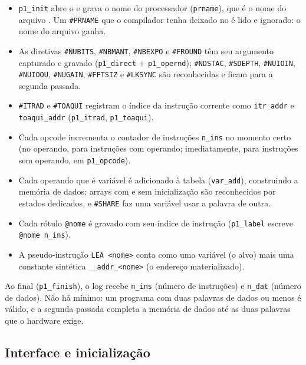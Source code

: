 \begin{itemize}[leftmargin=1.2em]
  \item \lstinline|p1_init| abre o  e grava o nome do
    processador (\lstinline|prname|), que é o nome do arquivo . Um
    \lstinline|#PRNAME| que o compilador tenha deixado no  é lido e
    ignorado: o nome do arquivo ganha.
  \item As diretivas \lstinline|#NUBITS|, \lstinline|#NBMANT|, \lstinline|#NBEXPO|
    e \lstinline|#FROUND| têm seu argumento capturado e gravado
    (\lstinline|p1_direct| + \lstinline|p1_opernd|); \lstinline|#NDSTAC|,
    \lstinline|#SDEPTH|, \lstinline|#NUIOIN|, \lstinline|#NUIOOU|,
    \lstinline|#NUGAIN|, \lstinline|#FFTSIZ| e \lstinline|#LKSYNC| são reconhecidas
    e ficam para a segunda passada.
  \item \lstinline|#ITRAD| e \lstinline|#TOAQUI| registram o índice da instrução
    corrente como \lstinline|itr_addr| e \lstinline|toaqui_addr|
    (\lstinline|p1_itrad|, \lstinline|p1_toaqui|).
  \item Cada opcode incrementa o contador de instruções \lstinline|n_ins| no
    momento certo (no operando, para instruções com operando; imediatamente, para
    instruções sem operando, em \lstinline|p1_opcode|).
  \item Cada operando que é variável é adicionado à tabela
    (\lstinline|var_add|), construindo a memória de dados; arrays com e sem
    inicialização são reconhecidos por estados dedicados, e \lstinline|#SHARE|
    faz uma variável usar a palavra de outra.
  \item Cada rótulo \lstinline|@nome| é gravado com seu índice de instrução
    (\lstinline|p1_label| escreve \lstinline|@nome n_ins|).
  \item A pseudo-instrução \lstinline|LEA <nome>| conta como uma variável (o alvo)
    mais uma constante sintética \lstinline|__addr_<nome>| (o endereço
    materializado).
\end{itemize}

Ao final (\lstinline|p1_finish|), o log recebe \lstinline|n_ins| (número de
instruções) e \lstinline|n_dat| (número de dados). Não há mínimo: um programa com
duas palavras de dados ou menos é válido, e a segunda passada completa a memória
de dados até as duas palavras que o hardware exige.

\subsection{Interface e inicialização}
\label{sec:yanc-asmcomp-cli}

